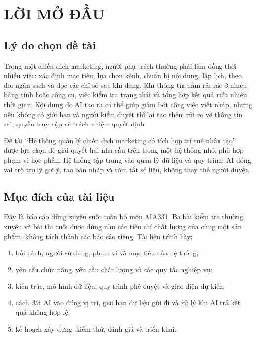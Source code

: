 \chapter*{LỜI MỞ ĐẦU}

\section*{Lý do chọn đề tài}

Trong một chiến dịch marketing, người phụ trách thường phải làm đồng thời nhiều việc: xác định mục tiêu, lựa chọn kênh, chuẩn bị nội dung, lập lịch, theo dõi ngân sách và đọc các chỉ số sau khi đăng. Khi thông tin nằm rải rác ở nhiều bảng tính hoặc công cụ, việc kiểm tra trạng thái và tổng hợp kết quả mất nhiều thời gian. Nội dung do AI tạo ra có thể giúp giảm bớt công việc viết nháp, nhưng nếu không có giới hạn và người kiểm duyệt thì lại tạo thêm rủi ro về thông tin sai, quyền truy cập và trách nhiệm quyết định.

Đề tài “Hệ thống quản lý chiến dịch marketing có tích hợp trí tuệ nhân tạo” được lựa chọn để giải quyết hai nhu cầu trên trong một hệ thống nhỏ, phù hợp phạm vi học phần. Hệ thống tập trung vào quản lý dữ liệu và quy trình; AI đóng vai trò trợ lý gợi ý, tạo bản nháp và tóm tắt số liệu, không thay thế người duyệt.

\section*{Mục đích của tài liệu}

Đây là báo cáo dùng xuyên suốt toàn bộ môn AIA331. Ba bài kiểm tra thường xuyên và bài thi cuối được dùng như các tiêu chí chất lượng của cùng một sản phẩm, không tách thành các báo cáo riêng. Tài liệu trình bày:

\begin{enumerate}
  \item bối cảnh, người sử dụng, phạm vi và mục tiêu của hệ thống;
  \item yêu cầu chức năng, yêu cầu chất lượng và các quy tắc nghiệp vụ;
  \item kiến trúc, mô hình dữ liệu, quy trình phê duyệt và giao diện dự kiến;
  \item cách đặt AI vào đúng vị trí, giới hạn dữ liệu gửi đi và xử lý khi AI trả kết quả không hợp lệ;
  \item kế hoạch xây dựng, kiểm thử, đánh giá và triển khai.
\end{enumerate}


